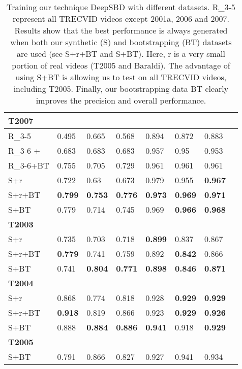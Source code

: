 \documentclass[journal]{IEEEtran}
\begin{document}
\begin{table}[h]
\begin{tabular}{| l | l | l | l | l | l | l| l| }
 \textbf{T2007} & & & & & & \\ 
\hline
     R\_3-5            & 0.495  & 0.665
& 0.568  & 0.894 & 0.872
& 0.883 \\
\hline
R\_3-6 + & 0.683
& 0.683  & 0.683 & 0.957
& 0.95  & 0.953 \\
\hline
R\_3-6+BT & 0.755 & 0.705 & 0.729 & 0.961 & 0.961 & 0.961 \\
\hline
S+r & 0.722 & 0.63 & 0.673 & 0.979 & 0.955 & \textbf{0.967} \\
\hline
S+r+BT  & \textbf{0.799} & \textbf{0.753} & \textbf{0.776} & \textbf{0.973} & \textbf{0.969} & \textbf{0.971}\\
\hline
S+BT  & 0.779 & 0.714 & 0.745 & 0.969 & \textbf{0.966} & \textbf{0.968}\\
\hline
\textbf{T2003} & & & & & & \\ 
\hline
S+r & 0.735 &	0.703 &	0.718 &	\textbf{0.899} &	0.837 &	0.867\\
\hline
S+r+BT & \textbf{0.779} &	0.741 &	0.759 &	0.892 &	\textbf{0.842} &	0.866\\
\hline
S+BT  & 0.741 &	\textbf{0.804} &	\textbf{0.771} &	\textbf{0.898} &	\textbf{0.846} &	\textbf{0.871}\\
\hline
\textbf{T2004} & & & & & & \\ 
\hline
S+r & 0.868	& 0.774 &	0.818	&	0.928 &	\textbf{0.929} &	\textbf{0.929} \\
\hline
S+r+BT & \textbf{0.918} &	0.819 &	0.866 &	0.923 &	\textbf{0.929} &	\textbf{0.926}\\
\hline
S+BT  & 0.888 &	\textbf{0.884} &	\textbf{0.886} &	\textbf{0.941} &	0.918 &	\textbf{0.929}\\
\hline
\textbf{T2005} & & & & & & \\ 
\hline
S+BT & 0.791 &	0.866 &	0.827 &	0.927 &	0.941 &	0.934 \\
\hline

\end{tabular}
\caption{Training our technique DeepSBD with different datasets. R\_3-5 represent all TRECVID videos except 2001a, 2006 and 2007.  Results show that the best performance is always generated when both our synthetic (S) and bootstrapping (BT) datasets are used (see S+r+BT and S+BT). Here, r is a very small portion of real videos (T2005 and Baraldi). The advantage of using S+BT is allowing us to test on all TRECVID videos, including T2005. Finally, our bootstrapping data BT clearly improves the precision and overall performance.}
\label{tab:OurDataImpact}
\end{table}
\end{document}
